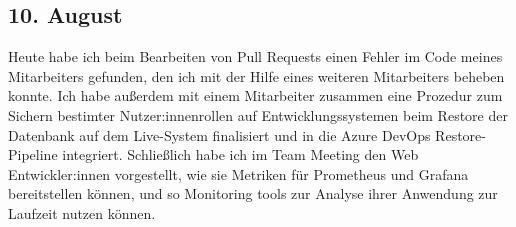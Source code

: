 \subsection{10. August}
Heute habe ich beim Bearbeiten von Pull Requests einen Fehler im Code meines Mitarbeiters gefunden, den ich mit der Hilfe eines weiteren Mitarbeiters beheben konnte. Ich habe außerdem mit einem Mitarbeiter zusammen eine Prozedur zum Sichern bestimter Nutzer:innenrollen auf Entwicklungssystemen beim Restore der Datenbank auf dem Live-System finalisiert und in die Azure DevOps Restore-Pipeline integriert. Schließlich habe ich im Team Meeting den Web Entwickler:innen vorgestellt, wie sie Metriken für Prometheus und Grafana bereitstellen können, und so Monitoring tools zur Analyse ihrer Anwendung zur Laufzeit nutzen können.